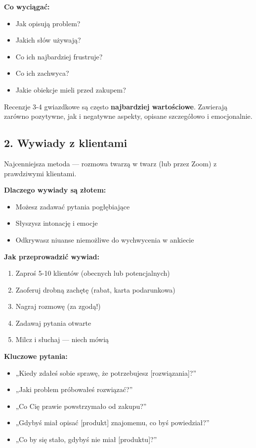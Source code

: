 \documentclass[
  12pt,
  a4paper,
  twoside,
  openright,
  12pt,
  DIV=12,
  BCOR=12mm]{scrbook}
\providecommand{\tightlist}{%
  \setlength{\itemsep}{0pt}\setlength{\parskip}{0pt}}\usepackage{longtable,booktabs,array}
\begin{document}
\textbf{Co wyciągać:}

\begin{itemize}
\tightlist
\item
  Jak opisują problem?
\item
  Jakich słów używają?
\item
  Co ich najbardziej frustruje?
\item
  Co ich zachwyca?
\item
  Jakie obiekcje mieli przed zakupem?
\end{itemize}

\begin{wskazowka}
Recenzje 3-4 gwiazdkowe są często \textbf{najbardziej wartościowe}. Zawierają zarówno pozytywne, jak i negatywne aspekty, opisane szczegółowo i emocjonalnie.
\end{wskazowka}

\subsection{2. Wywiady z klientami}\label{wywiady-z-klientami}

Najcenniejsza metoda --- rozmowa twarzą w twarz (lub przez Zoom) z
prawdziwymi klientami.

\textbf{Dlaczego wywiady są złotem:}

\begin{itemize}
\tightlist
\item
  Możesz zadawać pytania pogłębiające
\item
  Słyszysz intonację i emocje
\item
  Odkrywasz niuanse niemożliwe do wychwycenia w ankiecie
\end{itemize}

\textbf{Jak przeprowadzić wywiad:}

\begin{enumerate}
\def\labelenumi{\arabic{enumi}.}
\tightlist
\item
  Zaproś 5-10 klientów (obecnych lub potencjalnych)
\item
  Zaoferuj drobną zachętę (rabat, karta podarunkowa)
\item
  Nagraj rozmowę (za zgodą!)
\item
  Zadawaj pytania otwarte
\item
  Milcz i słuchaj --- niech mówią
\end{enumerate}

\textbf{Kluczowe pytania:}

\begin{itemize}
\tightlist
\item
  „Kiedy zdałeś sobie sprawę, że potrzebujesz {[}rozwiązania{]}?''
\item
  „Jaki problem próbowałeś rozwiązać?''
\item
  „Co Cię prawie powstrzymało od zakupu?''
\item
  „Gdybyś miał opisać {[}produkt{]} znajomemu, co byś powiedział?''
\item
  „Co by się stało, gdybyś nie miał {[}produktu{]}?''
\end{itemize}
\end{document}

